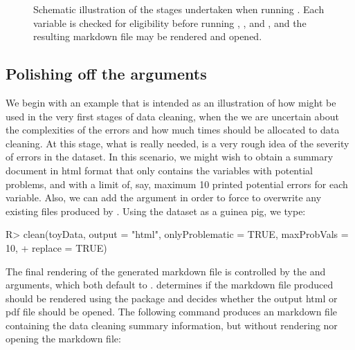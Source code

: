 \documentclass[article,shortnames]{jss}
\begin{document}
\begin{figure}[tb]
\caption{Schematic illustration of the stages undertaken when running
  . Each variable is checked for eligibility before
  running , , and , and the
  resulting  markdown file may be rendered and opened.}
\label{figure:cleanStructure}
\end{figure}





\subsection{Polishing off the arguments}
We begin with an example that is intended as an illustration of how
 might be used in the very first stages of data
cleaning, when the we are uncertain about the complexities of the
errors and how much times should be allocated to data cleaning. At
this stage, what is really needed, is a very rough idea of the
severity of errors in the dataset. In this scenario, we might wish to
obtain a summary document in html format that only contains the
variables with potential problems, and with a limit of, say, maximum
10 printed potential errors for each variable. Also, we can add the
argument  in order to force  to
overwrite any existing files produced by .  Using the
 dataset as a guinea pig, we type:

\begin{Schunk}
\begin{Sinput}
R> clean(toyData, output = "html", onlyProblematic = TRUE, maxProbVals = 10,
+    replace = TRUE)
\end{Sinput}
\end{Schunk}

The final rendering of the generated markdown file is controlled by
the  and  arguments, which both default to
.  determines if the  markdown file
produced should be rendered using the  \citep{rmarkdown} package and
 decides whether the output html or pdf file should be
opened. The following command produces an  markdown file
containing the data cleaning summary information, but without
rendering nor opening the markdown file:
\end{document}
